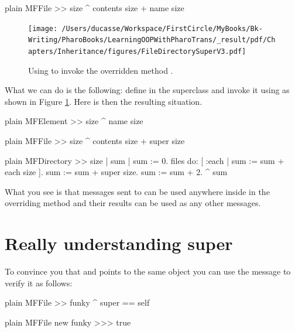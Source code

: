 \documentclass[10pt,twoside,english]{_support/latex/sbabook/sbabook}
\begin{document}
\begin{displaycode}{plain}
MFFile >> size
	^ contents size + name size
\end{displaycode}


\begin{figure}

\begin{center}
\texttt{[image: /Users/ducasse/Workspace/FirstCircle/MyBooks/Bk-Writing/PharoBooks/LearningOOPWithPharoTrans/\_result/pdf/Chapters/Inheritance/figures/FileDirectorySuperV3.pdf]}\caption{Using  to invoke the overridden method .\label{fig:FileDirectorySuperV3}}\end{center}
\end{figure}


What we can do is the following: define  in the superclass and invoke it using  as shown in Figure \ref{fig:FileDirectorySuperV3}. Here is then the resulting situation.

\begin{displaycode}{plain}
MFElement >> size
	^ name size
\end{displaycode}

\begin{displaycode}{plain}
MFFile >> size
	^ contents size + super size
\end{displaycode}

\begin{displaycode}{plain}
MFDirectory >> size
	| sum |
	sum := 0.
	files do: [ :each | sum := sum + each size ].
	sum := sum + super size.
	sum := sum + 2.
	^ sum
\end{displaycode}

What you see is that messages sent to  can be used anywhere inside in the overriding method and their results can be used as any other messages.
\section{Really understanding super}
To convince you that  and  points to the same object you can use the message \textcode{==} to verify it as follows: 

\begin{displaycode}{plain}
MFFile >> funky
	^ super == self
\end{displaycode}

\begin{displaycode}{plain}
MFFile new funky
>>> true
\end{displaycode}
\end{document}
